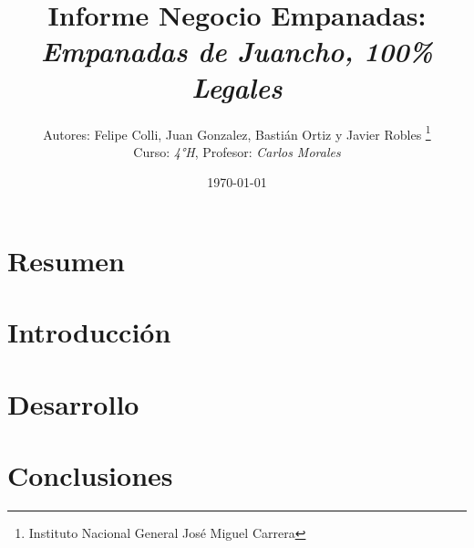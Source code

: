 \documentclass[11pt]{article}
\title{Informe Negocio Empanadas: \\
  \textit{Empanadas de Juancho, 100\% Legales}}
\author{Autores: Felipe Colli, Juan Gonzalez, Bastián Ortiz y Javier Robles \thanks{Instituto Nacional General José Miguel Carrera} \\ Curso: \textit{4°H}, Profesor: \textit{Carlos Morales}} %
\date{\today}
\begin{document}
\maketitle
\newpage

\tableofcontents
\newpage

\section{Resumen} %

\newpage



\section{Introducción} %

\newpage



\section{Desarrollo} %

\newpage



\section{Conclusiones} %
\end{document}
